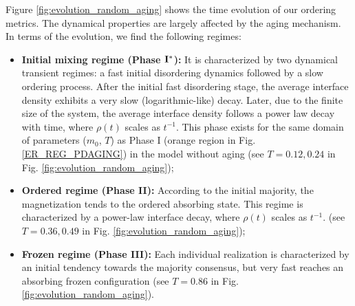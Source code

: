 	Figure \ref{fig:evolution_random_aging} shows the time evolution of our ordering metrics. The dynamical properties are largely affected by the aging mechanism. In terms of the evolution, we find the following regimes:
	\begin{itemize}
		\item \textbf{Initial mixing regime (Phase ${\rm {\bf I}}^{*}$):} It is characterized by two dynamical transient regimes: a fast initial disordering dynamics followed by a slow ordering process. After the initial fast disordering stage, the average interface density exhibits a very slow (logarithmic-like) decay. Later, due to the finite size of the system, the average interface density follows a power law decay with time, where $\rho(t)$ scales as $t^{-1}$. This phase exists for the same domain of parameters ($m_0$, $T$) as Phase I (orange region in Fig. \ref{ER_REG_PDAGING}) in the model without aging (see $T = 0.12, 0.24$ in Fig. \ref{fig:evolution_random_aging});
		\item \textbf{Ordered regime (Phase II):} According to the initial majority, the magnetization tends to the ordered absorbing state. This regime is characterized by a power-law interface decay, where $\rho(t)$ scales as $t^{-1}$. (see $T = 0.36, 0.49$ in Fig. \ref{fig:evolution_random_aging});
		\item \textbf{Frozen regime (Phase III):} Each individual realization is characterized by an initial tendency towards the majority consensus, but very fast reaches an absorbing frozen configuration (see $T = 0.86$ in Fig. \ref{fig:evolution_random_aging}).
	\end{itemize}

